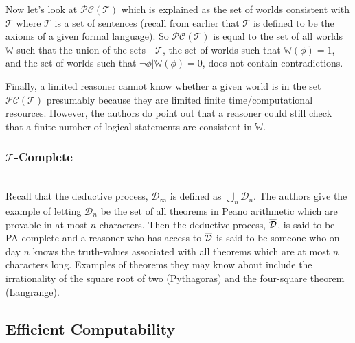 \documentclass{article}
\newcommand*{\field}[1]{\mathbb{#1}}%
\begin{document}
Now let's look at $\mathcal{P} \mathcal{C}(\mathcal{T})$ which is explained as the set of worlds consistent with $\mathcal{T}$ where  $\mathcal{T}$ is a set of sentences (recall from earlier that $\mathcal{T}$ is defined to be the axioms of a given formal language). So $\mathcal{P} \mathcal{C}(\mathcal{T})$ is equal to the set of all worlds $\field{W}$ such that the union of the sets - $\mathcal{T}$, the set of worlds such that  $\field{W}(\phi) = 1$, and the set of worlds such that $\neg\phi|\field{W}(\phi)=0$, does not contain contradictions. 

Finally, a limited reasoner cannot know whether a given world is in the set $\mathcal{P} \mathcal{C}(\mathcal{T})$ presumably because they are limited finite time/computational resources. However, the authors do point out that a reasoner could still check that a finite number of logical statements are consistent in $\field{W}$.


\subsubsection{$\mathcal{T}$-Complete} 

\noindent{}
\\

Recall that the deductive process, $\mathcal{D}_{\infty}$ is defined as $\bigcup_{n} \mathcal{D}_{n}$. The authors give the example of letting $\mathcal{D}_{n}$ be the set of all theorems in Peano arithmetic which are provable in at most $n$ characters. Then the deductive process, $\overline{\rm \mathcal{D}}$, is said to be PA-complete and a reasoner who has access to $\overline{\rm \mathcal{D}}$ is said to be someone who on day $n$ knows the truth-values associated with all theorems which are at most $n$ characters long. Examples of theorems they may know about include the irrationality of the square root of two (Pythagoras) and the four-square theorem (Langrange).

\subsection{Efficient Computability}
\end{document}
